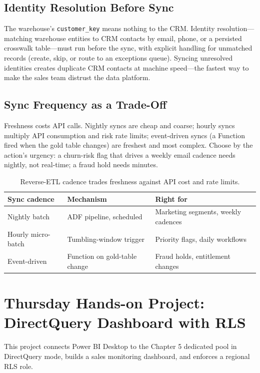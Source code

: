 \subsection{Identity Resolution Before Sync}
The warehouse's \texttt{customer\_key} means nothing to the CRM. Identity resolution---matching warehouse entities to CRM contacts by email, phone, or a persisted crosswalk table---must run before the sync, with explicit handling for unmatched records (create, skip, or route to an exceptions queue). Syncing unresolved identities creates duplicate CRM contacts at machine speed---the fastest way to make the sales team distrust the data platform.

\subsection{Sync Frequency as a Trade-Off}
Freshness costs API calls. Nightly syncs are cheap and coarse; hourly syncs multiply API consumption and risk rate limits; event-driven syncs (a Function fired when the gold table changes) are freshest and most complex. Choose by the action's urgency: a churn-risk flag that drives a weekly email cadence needs nightly, not real-time; a fraud hold needs minutes.

\begin{table}[H]
\centering
\small
\begin{tabular}{@{}p{3.0cm}p{4.4cm}p{5.6cm}@{}}
\toprule
\textbf{Sync cadence} & \textbf{Mechanism} & \textbf{Right for} \\
\midrule
Nightly batch & ADF pipeline, scheduled & Marketing segments, weekly cadences \\
Hourly micro-batch & Tumbling-window trigger & Priority flags, daily workflows \\
Event-driven & Function on gold-table change & Fraud holds, entitlement changes \\
\bottomrule
\end{tabular}
\caption{Reverse-ETL cadence trades freshness against API cost and rate limits.}
\label{tab:ch16-reverse-etl}
\end{table}

\section{Thursday Hands-on Project: DirectQuery Dashboard with RLS}
This project connects Power BI Desktop to the Chapter 5 dedicated pool in DirectQuery mode, builds a sales monitoring dashboard, and enforces a regional RLS role.

